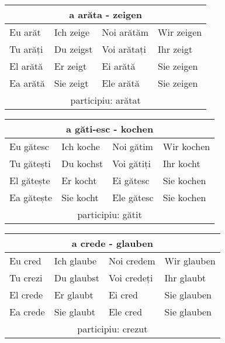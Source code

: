 \documentclass[11pt, oneside]{article}
\begin{document}
%
\begin{center}
  \begin{tabular}{ |p{3.25cm}|p{3.25cm}||p{3.25cm}|p{3.25cm}| }
      \hline
      \multicolumn{4}{|c|}{a arăta - zeigen} \\
      \hline
      \hline
      Eu arăt & Ich zeige & Noi arătăm & Wir zeigen\\
      \hline
      Tu arăți & Du zeigst & Voi arătați & Ihr zeigt\\
      \hline
      El arătă & Er zeigt & Ei arătă & Sie zeigen\\ 
      Ea arătă & Sie zeigt & Ele arătă & Sie zeigen\\
      \hline
      \multicolumn{4}{|c|}{participiu: arătat} \\
      \hline
     \end{tabular}
\end{center}
%
\begin{center}
  \begin{tabular}{ |p{3.25cm}|p{3.25cm}||p{3.25cm}|p{3.25cm}| }
      \hline
      \multicolumn{4}{|c|}{a găti-esc - kochen} \\
      \hline
      \hline
      Eu gătesc & Ich koche & Noi gătim & Wir kochen\\
      \hline
      Tu gătești & Du kochst & Voi gătiți & Ihr kocht\\
      \hline
      El gătește & Er kocht & Ei gătesc & Sie kochen\\ 
      Ea gătește & Sie kocht & Ele gătesc & Sie kochen\\
      \hline
      \multicolumn{4}{|c|}{participiu: gătit} \\
      \hline
     \end{tabular}
\end{center}
%
\begin{center}
  \begin{tabular}{ |p{3.25cm}|p{3.25cm}||p{3.25cm}|p{3.25cm}| }
      \hline
      \multicolumn{4}{|c|}{a crede - glauben} \\
      \hline
      \hline
      Eu cred & Ich glaube & Noi credem & Wir glauben\\
      \hline
      Tu crezi & Du glaubst & Voi credeți & Ihr glaubt\\
      \hline
      El crede & Er glaubt & Ei cred & Sie glauben\\ 
      Ea crede & Sie glaubt & Ele cred & Sie glauben\\
      \hline
      \multicolumn{4}{|c|}{participiu: crezut} \\
      \hline
     \end{tabular}
\end{center}
\end{document}
